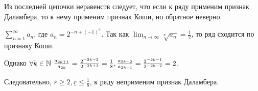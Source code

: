\begin{note}
    Из последней цепочки неравенств следует, что если к ряду применим признак Даламбера, то к нему применим признак Коши, но обратное неверно.

    \begin{example}
        $\sum_{n = 1}^\infty a_n$, где $a_n = 2^{-n + (-1)^n}$. Так как $\lim_{n \rightarrow \infty} \sqrt[n]{a_n} = \frac{1}{2}$, то ряд сходится по признаку Коши.

        Однако $\forall k \in \mathbb{N} \ \frac{a_{2k + 1}}{a_{2k}} = \frac{2^{-2k - 2}}{2^{-2k + 1}} = \frac{1}{8}, \frac{a_{2k + 2}}{a_{2k + 1}} = \frac{2^{-2k - 1}}{2^{-2k - 2}} = 2$.

        Следовательно, $\overline{r} \ge 2, \underline{r} \le \frac{1}{8}$, к ряду неприменим признак Даламбера.
    \end{example}
\end{note}

